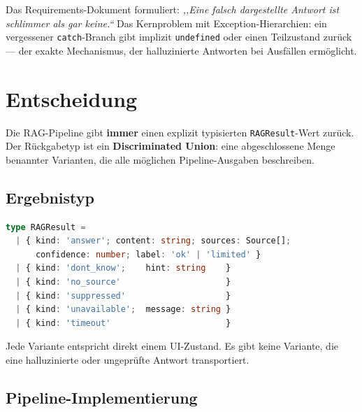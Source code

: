 \documentclass[a4paper, 11pt, oneside]{report}
\newcommand{\code}[1]{\texttt{\small #1}}
\begin{document}
Das Requirements-Dokument formuliert: \textit{,,Eine falsch dargestellte Antwort
ist schlimmer als gar keine.``} Das Kernproblem mit Exception-Hierarchien:
ein vergessener \code{catch}-Branch gibt implizit \code{undefined} oder einen
Teilzustand zurück --- der exakte Mechanismus, der halluzinierte Antworten
bei Ausfällen ermöglicht.

\section{Entscheidung}

Die RAG-Pipeline gibt \textbf{immer} einen explizit typisierten
\code{RAGResult}-Wert zurück. Der Rückgabetyp ist ein
\textbf{Discriminated Union}: eine abgeschlossene Menge benannter
Varianten, die alle möglichen Pipeline-Ausgaben beschreiben.

\subsection{Ergebnistyp}

\begin{lstlisting}[language=TypeScript]
type RAGResult =
  | { kind: 'answer'; content: string; sources: Source[];
      confidence: number; label: 'ok' | 'limited' }
  | { kind: 'dont_know';    hint: string    }
  | { kind: 'no_source'                     }
  | { kind: 'suppressed'                    }
  | { kind: 'unavailable';  message: string }
  | { kind: 'timeout'                       }
\end{lstlisting}

Jede Variante entspricht direkt einem UI-Zustand. Es gibt keine Variante,
die eine halluzinierte oder ungeprüfte Antwort transportiert.

\subsection{Pipeline-Implementierung}
\end{document}
